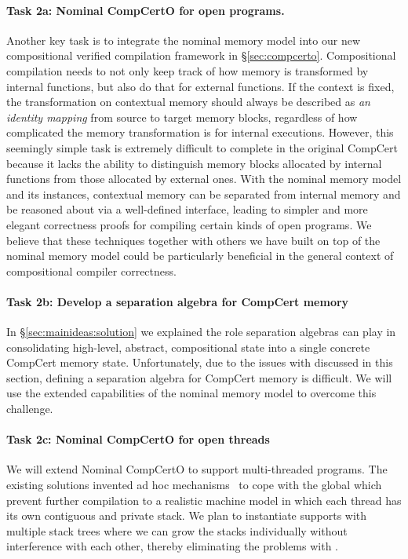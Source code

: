 \paragraph*{Task 2a: Nominal CompCertO for open programs.}
Another key task is to integrate the nominal memory model into our
new compositional verified compilation framework in
\S\ref{sec:compcerto}.  Compositional compilation needs to not only
keep track of how memory is transformed by internal functions, but
also do that for external functions.  If the context is fixed, the
transformation on contextual memory should always be described as
\emph{an identity mapping} from source to target memory blocks,
regardless of how complicated the memory transformation is for
internal executions.  However, this seemingly simple task is extremely
difficult to complete in the original CompCert because it lacks the
ability to distinguish memory blocks allocated by internal functions
from those allocated by external ones. With the nominal memory model and its
instances, contextual memory can be separated from internal memory and
be reasoned about via a well-defined interface, leading to simpler and
more elegant correctness proofs for compiling certain kinds of open
programs. We believe that these techniques together with others we
have built on top of the nominal memory model could be particularly
beneficial in the general context of compositional compiler
correctness.

\vspace*{-2ex}
\paragraph*{Task 2b: Develop a separation algebra for CompCert memory}
In \S\ref{sec:mainideas:solution}
we explained the role separation algebras can play
in consolidating high-level, abstract, compositional state
into a single concrete CompCert memory state.
%
Unfortunately,
due to the issues with \nextblock
discussed in this section,
defining a separation algebra for CompCert memory
is difficult.
We will use the extended capabilities of
the nominal memory model
to overcome this challenge.

\vspace*{-2ex}
\paragraph*{Task 2c: Nominal CompCertO for open threads}
We will extend Nominal CompCertO to support
multi-threaded programs. The existing solutions invented ad hoc
mechanisms~\cite{ccal18} to cope with the global \nextblock which
prevent further compilation to a realistic machine model in which each
thread has its own contiguous and private stack. We plan to
instantiate supports with multiple stack trees where we can grow
the stacks individually without interference with each other, thereby
eliminating the problems with \nextblock.



